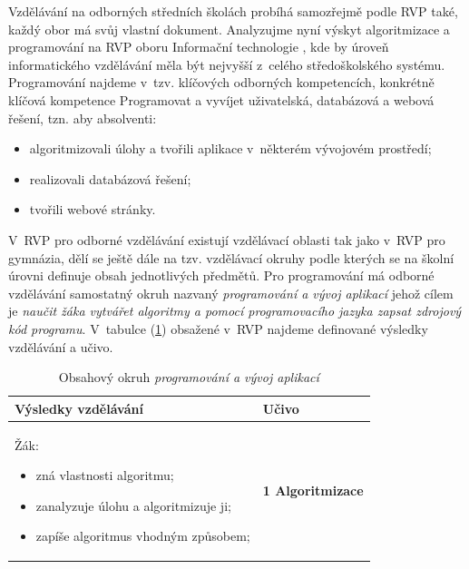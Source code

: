 \documentclass[FP,DP]{tulthesis}
\begin{document}
{Vzdělávání na odborných středních školách probíhá samozřejmě podle RVP také, každý obor má svůj vlastní dokument.  Analyzujme nyní výskyt algoritmizace a programování na RVP oboru Informační technologie , kde by úroveň informatického vzdělávání měla být nejvyšší z~celého středoškolského systému. Programování najdeme v~tzv. klíčových odborných kompetencích, konkrétně klíčová kompetence Programovat a vyvíjet uživatelská, databázová a webová řešení, tzn. aby absolventi: 
 \begin{itemize}
\setlength\itemsep{0.1em}
\item algoritmizovali úlohy a tvořili aplikace v~některém vývojovém prostředí; 
\item realizovali databázová řešení;  
\item tvořili webové stránky. 
\end{itemize}
 V~RVP pro odborné vzdělávání  existují vzdělávací oblasti tak jako v~RVP pro gymnázia, dělí se ještě dále na tzv. vzdělávací okruhy podle kterých se na školní úrovni definuje obsah jednotlivých předmětů. Pro programování má odborné vzdělávání samostatný okruh nazvaný \textit {programování a vývoj aplikací} jehož cílem je \textit {naučit žáka vytvářet algoritmy a pomocí programovacího jazyka zapsat  zdrojový  kód  programu}. V~tabulce (\ref{table:1}) obsažené v~RVP najdeme definované výsledky vzdělávání a učivo.
{\renewcommand{\arraystretch}{1.4}%
\begin{table}[ht]
\footnotesize
\center
\caption{Obsahový okruh \textit {programování a vývoj aplikací}} \label{table:1}
\begin{tabular}{|l|l|}
\hline
Výsledky vzdělávání & Učivo \\\hline
  \begin{minipage}[t]{0.45\textwidth}
    Žák:
\begin{itemize}[leftmargin=*,nosep]
  	\item zná vlastnosti algoritmu; 
	\item zanalyzuje úlohu a algoritmizuje ji; 
	\item zapíše algoritmus vhodným způsobem; 
\end{itemize}
  \end{minipage} &
  \begin{minipage}[t]{0.45\textwidth}
\textbf{1 Algoritmizace}
    \begin{itemize}[leftmargin=*,nosep]

\end{itemize}
\end{minipage}
\end{tabular}
\end{table}}}
\end{document}
